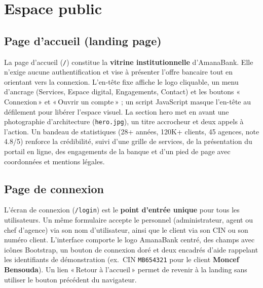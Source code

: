 \documentclass[11pt,a4paper,oneside]{report}
\begin{document}
\section{Espace public}

\subsection{Page d'accueil (landing page)}

La page d'accueil (\texttt{/}) constitue la \textbf{vitrine institutionnelle} d'AmanaBank. Elle n'exige aucune authentification et vise à présenter l'offre bancaire tout en orientant vers la connexion. L'en-tête fixe affiche le logo cliquable, un menu d'ancrage (Services, Espace digital, Engagements, Contact) et les boutons «\,Connexion\,» et «\,Ouvrir un compte\,» ; un script JavaScript masque l'en-tête au défilement pour libérer l'espace visuel. La section hero met en avant une photographie d'architecture (\texttt{hero.jpg}), un titre accrocheur et deux appels à l'action. Un bandeau de statistiques (28+ années, 120K+ clients, 45 agences, note 4.8/5) renforce la crédibilité, suivi d'une grille de services, de la présentation du portail en ligne, des engagements de la banque et d'un pied de page avec coordonnées et mentions légales.



\subsection{Page de connexion}

L'écran de connexion (\texttt{/login}) est le \textbf{point d'entrée unique} pour tous les utilisateurs. Un même formulaire accepte le personnel (administrateur, agent ou chef d'agence) via son nom d'utilisateur, ainsi que le client via son CIN ou son numéro client. L'interface comporte le logo AmanaBank centré, des champs avec icônes Bootstrap, un bouton de connexion doré et deux encadrés d'aide rappelant les identifiants de démonstration (ex.\ CIN \texttt{MB654321} pour le client \textbf{Moncef Bensouda}). Un lien «\,Retour à l'accueil\,» permet de revenir à la landing sans utiliser le bouton précédent du navigateur.
\end{document}
